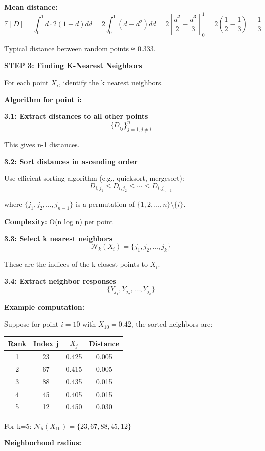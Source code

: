 \documentclass[12pt]{article}
\begin{document}
\begin{solution}
\textbf{Mean distance:}
\[
\mathbb{E}[D] = \int_0^1 d \cdot 2(1-d)dd = 2\int_0^1 (d - d^2)dd = 2\left[\frac{d^2}{2} - \frac{d^3}{3}\right]_0^1 = 2\left(\frac{1}{2} - \frac{1}{3}\right) = \frac{1}{3}
\]

Typical distance between random points ≈ 0.333.

\textbf{STEP 3: Finding K-Nearest Neighbors}

For each point $X_i$, identify the k nearest neighbors.

\textbf{Algorithm for point i:}

\textbf{3.1: Extract distances to all other points}
\[
\{D_{ij}\}_{j=1, j \neq i}^n
\]

This gives n-1 distances.

\textbf{3.2: Sort distances in ascending order}

Use efficient sorting algorithm (e.g., quicksort, mergesort):
\[
D_{i,j_1} \leq D_{i,j_2} \leq \cdots \leq D_{i,j_{n-1}}
\]

where $\{j_1, j_2, \ldots, j_{n-1}\}$ is a permutation of $\{1, 2, \ldots, n\} \setminus \{i\}$.

\textbf{Complexity:} O(n log n) per point

\textbf{3.3: Select k nearest neighbors}
\[
\mathcal{N}_k(X_i) = \{j_1, j_2, \ldots, j_k\}
\]

These are the indices of the k closest points to $X_i$.

\textbf{3.4: Extract neighbor responses}
\[
\{Y_{j_1}, Y_{j_2}, \ldots, Y_{j_k}\}
\]

\textbf{Example computation:}

Suppose for point $i=10$ with $X_{10} = 0.42$, the sorted neighbors are:

\begin{center}
\begin{tabular}{c|c|c|c}
Rank & Index j & $X_j$ & Distance \\
\hline
1 & 23 & 0.425 & 0.005 \\
2 & 67 & 0.415 & 0.005 \\
3 & 88 & 0.435 & 0.015 \\
4 & 45 & 0.405 & 0.015 \\
5 & 12 & 0.450 & 0.030 \\
\end{tabular}
\end{center}

For k=5: $\mathcal{N}_5(X_{10}) = \{23, 67, 88, 45, 12\}$

\textbf{Neighborhood radius:}


\end{solution}
\end{document}
